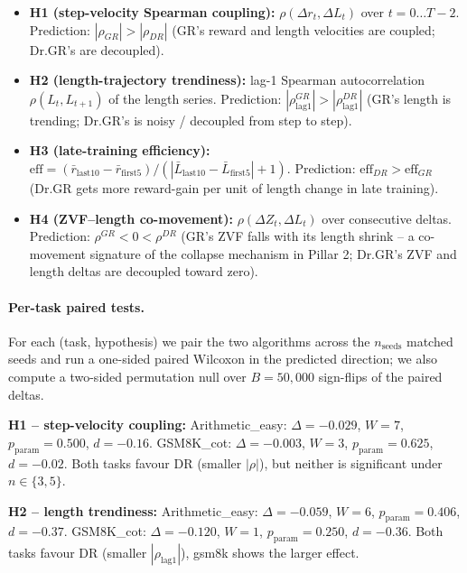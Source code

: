 \begin{itemize}
\item \textbf{H1 (step-velocity Spearman coupling):}
  $\rho(\Delta r_t, \Delta L_t)$ over $t = 0 \ldots T-2$.
  Prediction: $| \rho_{GR} | > | \rho_{DR} |$
  (GR's reward and length velocities are coupled; Dr.GR's are decoupled).
\item \textbf{H2 (length-trajectory trendiness):}
  lag-1 Spearman autocorrelation $\rho(L_t, L_{t+1})$ of the length series.
  Prediction: $| \rho^{GR}_{\mathrm{lag}1} | > | \rho^{DR}_{\mathrm{lag}1} |$
  (GR's length is trending; Dr.GR's is noisy / decoupled from step to step).
\item \textbf{H3 (late-training efficiency):}
  $\mathrm{eff} = ( \bar r_{\mathrm{last10}} - \bar r_{\mathrm{first5}} )
                / ( | \bar L_{\mathrm{last10}} - \bar L_{\mathrm{first5}} | + 1 )$.
  Prediction: $\mathrm{eff}_{DR} > \mathrm{eff}_{GR}$
  (Dr.GR gets more reward-gain per unit of length change in late training).
\item \textbf{H4 (ZVF--length co-movement):}
  $\rho(\Delta Z_t, \Delta L_t)$ over consecutive deltas.
  Prediction: $\rho^{GR} < 0 < \rho^{DR}$ (GR's ZVF falls with its length
  shrink -- a co-movement signature of the collapse mechanism in Pillar 2;
  Dr.GR's ZVF and length deltas are decoupled toward zero).
\end{itemize}

\paragraph{Per-task paired tests.}
For each (task, hypothesis) we pair the two algorithms across the
$n_{\mathrm{seeds}}$ matched seeds and run a one-sided paired Wilcoxon
in the predicted direction; we also compute a two-sided permutation
null over $B = 50{,}000$ sign-flips of the paired deltas.

\textbf{H1 -- step-velocity coupling:}
Arithmetic\_easy: $\Delta = -0.029$, $W=7$, $p_{\mathrm{param}}=0.500$,
$d = -0.16$.  GSM8K\_cot: $\Delta = -0.003$, $W=3$, $p_{\mathrm{param}}=0.625$,
$d = -0.02$.  Both tasks favour DR (smaller $|\rho|$), but neither is
significant under $n \in \{3, 5\}$.

\textbf{H2 -- length trendiness:}
Arithmetic\_easy: $\Delta = -0.059$, $W=6$, $p_{\mathrm{param}}=0.406$,
$d = -0.37$.  GSM8K\_cot: $\Delta = -0.120$, $W=1$, $p_{\mathrm{param}}=0.250$,
$d = -0.36$.  Both tasks favour DR (smaller $|\rho_{\mathrm{lag}1}|$),
gsm8k shows the larger effect.

